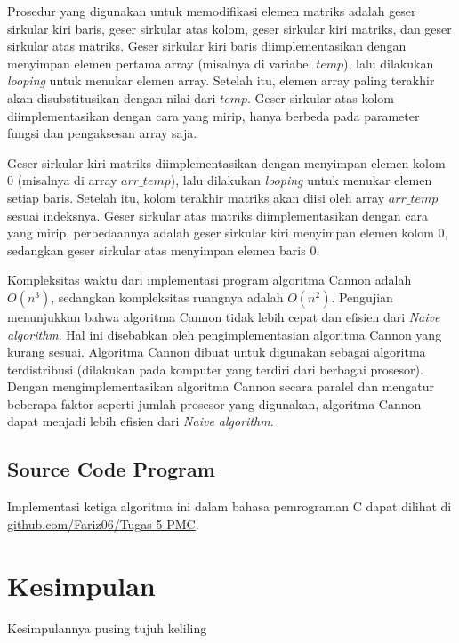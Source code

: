 \documentclass[conference]{IEEEtran}
\begin{document}
Prosedur yang digunakan untuk memodifikasi elemen matriks adalah geser sirkular kiri baris, geser sirkular atas kolom, geser sirkular kiri matriks, dan geser sirkular atas matriks.
Geser sirkular kiri baris diimplementasikan dengan menyimpan elemen pertama array (misalnya di variabel $temp$), lalu dilakukan \textit{looping} untuk menukar elemen array.
Setelah itu, elemen array paling terakhir akan disubstitusikan dengan nilai dari $temp$.
Geser sirkular atas kolom diimplementasikan dengan cara yang mirip, hanya berbeda pada parameter fungsi dan pengaksesan array saja.

Geser sirkular kiri matriks diimplementasikan dengan menyimpan elemen kolom 0 (misalnya di array $arr\_temp$), lalu dilakukan \textit{looping} untuk menukar elemen setiap baris.
Setelah itu, kolom terakhir matriks akan diisi oleh array $arr\_temp$ sesuai indeksnya.
Geser sirkular atas matriks diimplementasikan dengan cara yang mirip, 
perbedaannya adalah geser sirkular kiri menyimpan elemen kolom 0, sedangkan geser sirkular atas menyimpan elemen baris 0.

Kompleksitas waktu dari implementasi program algoritma Cannon adalah $O(n^3)$, 
sedangkan kompleksitas ruangnya adalah $O(n^2)$.
Pengujian menunjukkan bahwa algoritma Cannon tidak lebih cepat dan efisien dari \textit{Naive algorithm}.
Hal ini disebabkan oleh pengimplementasian algoritma Cannon yang kurang sesuai.
Algoritma Cannon dibuat untuk digunakan sebagai algoritma terdistribusi (dilakukan pada komputer yang terdiri dari berbagai prosesor).
Dengan mengimplementasikan algoritma Cannon secara paralel dan mengatur beberapa faktor seperti jumlah prosesor yang digunakan, algoritma Cannon dapat menjadi lebih efisien dari \textit{Naive algorithm}.


\subsection{Source Code Program}
Implementasi ketiga algoritma ini dalam bahasa pemrograman C dapat dilihat di
\href{https://github.com/Fariz06/Tugas-5-PMC}{github.com/Fariz06/Tugas-5-PMC}.

\section{Kesimpulan}
Kesimpulannya pusing tujuh keliling
\end{document}
